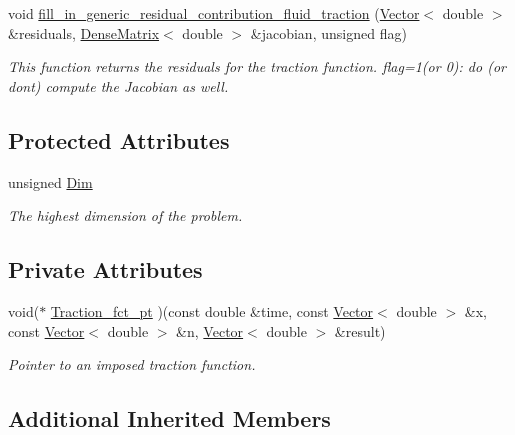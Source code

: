 \begin{DoxyCompactItemize}
void \hyperlink{classoomph_1_1NavierStokesTractionElement_a7c28b510ac27af92bae51f521cec5890}{fill\+\_\+in\+\_\+generic\+\_\+residual\+\_\+contribution\+\_\+fluid\+\_\+traction} (\hyperlink{classoomph_1_1Vector}{Vector}$<$ double $>$ \&residuals, \hyperlink{classoomph_1_1DenseMatrix}{Dense\+Matrix}$<$ double $>$ \&jacobian, unsigned flag)
\begin{DoxyCompactList}\small\item\em This function returns the residuals for the traction function. flag=1(or 0)\+: do (or don\textquotesingle{}t) compute the Jacobian as well. \end{DoxyCompactList}\end{DoxyCompactItemize}
\subsection*{Protected Attributes}
\begin{DoxyCompactItemize}
\item 
unsigned \hyperlink{classoomph_1_1NavierStokesTractionElement_a93c55d3fa89463f7a39ed84998c569d0}{Dim}
\begin{DoxyCompactList}\small\item\em The highest dimension of the problem. \end{DoxyCompactList}\end{DoxyCompactItemize}
\subsection*{Private Attributes}
\begin{DoxyCompactItemize}
\item 
void($\ast$ \hyperlink{classoomph_1_1NavierStokesTractionElement_a487a7d11742c2e08c5d2c804df6d5eda}{Traction\+\_\+fct\+\_\+pt} )(const double \&time, const \hyperlink{classoomph_1_1Vector}{Vector}$<$ double $>$ \&x, const \hyperlink{classoomph_1_1Vector}{Vector}$<$ double $>$ \&n, \hyperlink{classoomph_1_1Vector}{Vector}$<$ double $>$ \&result)
\begin{DoxyCompactList}\small\item\em Pointer to an imposed traction function. \end{DoxyCompactList}\end{DoxyCompactItemize}
\subsection*{Additional Inherited Members}


